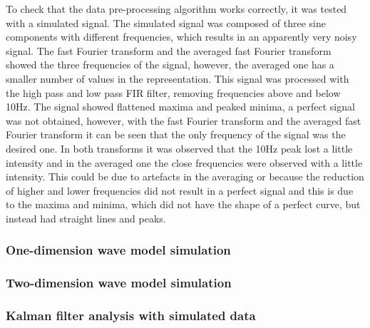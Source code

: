 \documentclass[12pt, a4paper]{article} %
\begin{document}
To check that the data pre-processing algorithm works correctly, it was tested with a simulated signal. The simulated signal was composed of three sine components with different frequencies, which results in an apparently very noisy signal. The fast Fourier transform and the averaged fast Fourier transform showed the three frequencies of the signal, however, the averaged one has a smaller number of values in the representation. This signal was processed with the high pass and low pass FIR filter, removing frequencies above and below 10Hz. The signal showed flattened maxima and peaked minima, a perfect signal was not obtained, however, with the fast Fourier transform and the averaged fast Fourier transform it can be seen that the only frequency of the signal was the desired one. In both transforms it was observed that the 10Hz peak lost a little intensity and in the averaged one the close frequencies were observed with a little intensity. This could be due to artefacts in the averaging or because the reduction of higher and lower frequencies did not result in a perfect signal and this is due to the maxima and minima, which did not have the shape of a perfect curve, but instead had straight lines and peaks.

\setlength{\parskip}{4mm}

\subsubsection{One-dimension wave model simulation}


\setlength{\parskip}{0mm}

\setlength{\parskip}{4mm}

\subsubsection{Two-dimension wave model simulation}


\setlength{\parskip}{0mm}

\setlength{\parskip}{4mm}

\subsubsection{Kalman filter analysis with simulated data}
\end{document}
